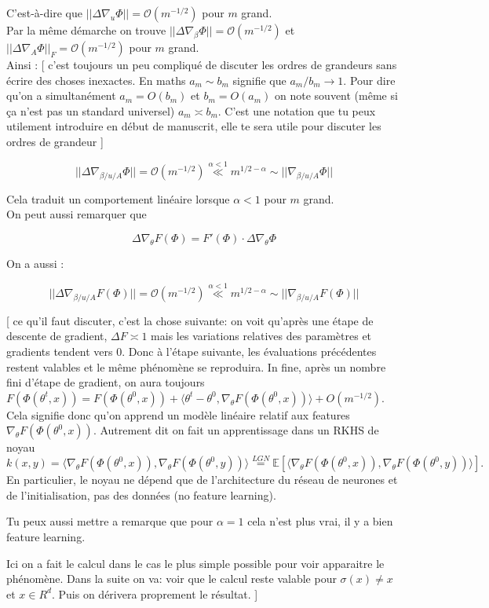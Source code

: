 \documentclass[a4paper, 11pt, french]{article}
\newcommand{\ch}[1]{{\color{blue} [ #1 ]}}
\begin{document}
\begin{itemize}
	C'est-à-dire que $||\Delta \nabla_u \Phi|| = \mathcal{O}(m^{-1/2})$ pour $m$ grand. \\
	
	Par la même démarche on trouve $||\Delta \nabla_{\beta} \Phi|| = \mathcal{O}(m^{-1/2})$ et $||\Delta \nabla_{A} \Phi||_F = \mathcal{O}(m^{-1/2})$ pour $m$ grand. \\
	
	Ainsi : \ch{c'est toujours un peu compliqu\'e de discuter les ordres de grandeurs sans \'ecrire des choses inexactes. En maths $a_{m}\sim b_{m}$ signifie que $a_{m}/b_{m}\to 1$. Pour dire qu'on a simultan\'ement $a_{m}=O(b_{m})$ et $b_{m}=O(a_{m})$ on note souvent (m\^eme si \c{c}a n'est pas un standard universel) $a_{m}\asymp b_{m}$. C'est une notation que tu peux utilement introduire en d\'ebut de manuscrit, elle te sera utile pour discuter les ordres de grandeur}
	
	\[||\Delta \nabla_{\beta / u / A} \Phi|| = \mathcal{O}(m^{-1/2}) \stackrel{\alpha < 1}{\ll} m^{1/2 - \alpha} \sim ||\nabla_{\beta / u / A} \Phi||\]
	
	Cela traduit un comportement linéaire lorsque $\alpha < 1$ pour $m$ grand. \\
	
	On peut aussi remarquer que
	
	\[\Delta \nabla_{\theta} F(\Phi) =  F'(\Phi) \cdot \Delta \nabla_{\theta} \Phi \]
	
	On a aussi :

	\[||\Delta \nabla_{\beta / u / A} F(\Phi) || = \mathcal{O}(m^{-1/2}) \stackrel{\alpha < 1}{\ll} m^{1/2 - \alpha} \sim ||\nabla_{\beta / u / A} F(\Phi)||\]

	\ch{ce qu'il faut discuter, c'est la chose suivante: on voit qu'apr\`es une \'etape de descente de gradient, $\Delta F\asymp 1$ mais les variations relatives des param\`etres et gradients tendent vers 0. Donc \`a l'\'etape suivante, les \'evaluations pr\'ec\'edentes restent valables et le m\^eme ph\'enom\`ene se reproduira. In fine, apr\`es un nombre fini d'\'etape de gradient, on aura toujours $F(\Phi(\theta^t, x)) = F(\Phi(\theta^0, x)) + \langle \theta^t-\theta^0 , \nabla_{\theta} F(\Phi(\theta^0, x))  \rangle  +O(m^{-1/2})$. Cela signifie donc qu'on apprend un mod\`ele lin\'eaire relatif aux features $\nabla_{\theta} F(\Phi(\theta^0, x))$. Autrement dit on fait un apprentissage dans un RKHS de noyau
	$$k(x,y)=\langle\nabla_{\theta} F(\Phi(\theta^0, x)),\nabla_{\theta} F(\Phi(\theta^0, y))\rangle \stackrel{LGN}{=} \mathbb{E}[\langle\nabla_{\theta} F(\Phi(\theta^0, x)),\nabla_{\theta} F(\Phi(\theta^0, y))\rangle].$$
	En particulier, le noyau ne d\'epend que de l'architecture du r\'eseau de neurones et de l'initialisation, pas des donn\'ees (no feature learning).
	
	Tu peux aussi mettre a remarque que pour $\alpha=1$ cela n'est plus vrai, il y a bien feature learning.
	
	Ici on a fait le calcul dans le cas le plus simple possible pour voir apparaitre le ph\'enom\`ene. Dans la suite on va: voir que le calcul reste valable pour $\sigma(x)\neq x$ et $x\in R^d$. Puis on d\'erivera proprement le r\'esultat. 
	}
		
	\end{itemize}

	
	
\end{document}
